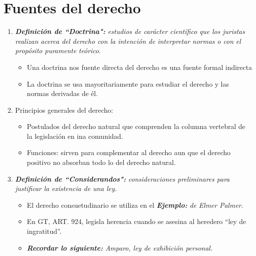 \section{Fuentes del derecho}
\begin{enumerate}
    \item \emph{\textbf{Definición de ``Doctrina":} estudios de carácter científico que los juristas realizan acerca del derecho con la intención de interpretar normas o con el propósito puramente teórico}.
        \begin{itemize}
            \item Una doctrina nos fuente directa del derecho es una fuente formal indirecta
            \item La doctrina se usa mayoritariamente para estudiar el derecho y las normas derivadas de él. 
        \end{itemize}
    
    \item Principios generales del derecho:
        \begin{itemize}
            \item Postulados del derecho natural que comprenden la columna vertebral de la legislación en ina comunidad.
            \item Funciones: sirven para complementar al derecho aun que el derecho positivo no absorban todo lo del derecho natural.
        \end{itemize}
    
    \item \emph{\textbf{Definición de ``Considerandos":} consideraciones preliminares para justificar la existencia de una ley.}
        \begin{itemize}
            \item El derecho consuetudinario se utiliza en el \emph{\textbf{Ejemplo: }de Elmer Palmer}.
            \item En GT, ART. 924, legisla herencia cuando se asesina al heredero ``ley de ingratitud''.
            \item \emph{\textbf{Recordar lo siguiente: }Amparo, ley de exhibición personal.}
        \end{itemize}
    

\end{enumerate}
